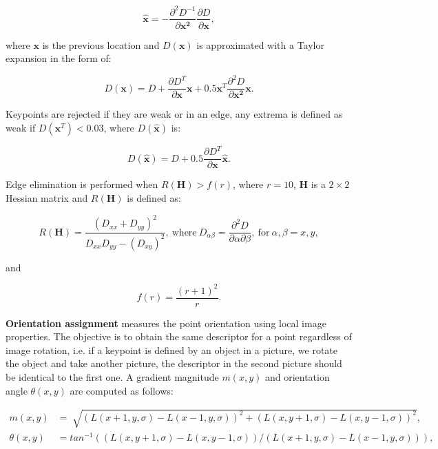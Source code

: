\documentclass[12pt]{article}
\begin{document}
\begin{equation}
\mathbf{\hat{x}} = - \frac{\partial^2 D^{-1}}{\partial \mathbf{x^2}} \frac{\partial D}{\partial \mathbf{x}},
\end{equation}

where $\mathbf{x}$ is the previous location and $D(\mathbf{x})$ is approximated with a Taylor expansion in the form of:

\begin{equation}
D(\mathbf{x}) = D + \frac{ \partial D^T}{\partial \mathbf{x}} \mathbf{x} + 0.5 \mathbf{x}^T \frac{\partial^2 D}{\partial \mathbf{x^2}}\mathbf{x}.
\end{equation}

Keypoints are rejected if they are weak or in an edge, any extrema is defined as weak if $D(\mathbf{x}^T) < 0.03$, where $D(\mathbf{\hat{x}})$ is:

\begin{equation}
D(\mathbf{\hat{x}}) = D + 0.5 \frac{\partial D^T}{\partial \mathbf{x}}\mathbf{\hat{x}}.
\end{equation}

Edge elimination is performed when $R(\mathbf{H}) > f(r)$, where $r = 10$, $\mathbf{H}$ is a $2 \times 2$ Hessian matrix and $R(\mathbf{H})$ is defined as:

\begin{equation}
R(\mathbf{H})= \frac{ (D_{xx} + D_{yy})^2 }{ D_{xx} D_{yy} - (D_{xy})^2}, \: \text{where} \: D_{\alpha \beta} = \frac{\partial^2 D}{\partial \alpha \partial \beta}, \:  \text{for} \: \alpha, \beta = x, y,
\end{equation}

and 

\begin{equation}
f(r) = \frac{(r + 1)^2}{r}.
\end{equation}

\textbf{Orientation assignment} measures the point orientation using local image properties.
The objective is to obtain the same descriptor for a point regardless of image rotation, i.e. if a keypoint is defined by an object in a picture, we rotate the object and take another picture, the descriptor in the second picture should be identical to the first one.
A gradient magnitude $m(x,y)$ and orientation angle $\theta(x,y)$ are computed as follows:

\begin{equation}
\begin{aligned}
	m(x,y) &= \sqrt[]{(L(x+1,y,\sigma) - L(x-1,y,\sigma))^2 + (L(x,y+1,\sigma) - L(x,y-1,\sigma))^2}, \\
	\theta(x,y) &= tan^{-1} \left( \left( L(x,y+1,\sigma) - L(x, y-1, \sigma) \right) / \left( L(x+1,y,\sigma) - L(x-1, y, \sigma) \right) \right),
\end{aligned} \label{eq:conv}
\end{equation}
\end{document}
